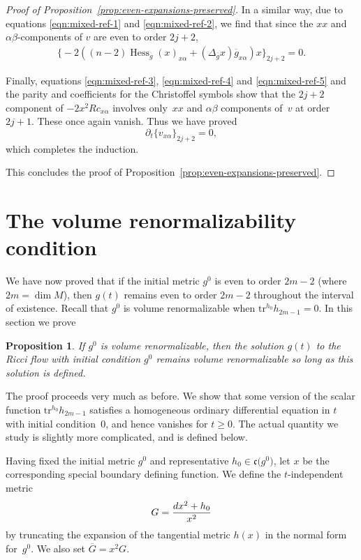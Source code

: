 \documentclass[11pt]{article}
\numberwithin{equation}{section}
\newtheorem{Proposition}[Theorem]{Proposition}
 { \theoremstyle{definition}
\newtheorem{Definition}[Theorem]{Definition}
\newtheorem{Example}[Theorem]{Example}
\newtheorem{Remark}[Theorem]{Remark} }
\newcommand{\olg}{\overline{g}}
\newcommand{\olG}{\overline{G}}
\newcommand{\frakc}{\mathfrak c}
\newcommand{\gin}{{g^0}}
\newcommand{\tr}{\mathrm{tr}}
\DeclareMathOperator{\hess}{Hess}
\begin{document}
\begin{proof}[Proof of Proposition~\ref{prop:even-expansions-preserved}]
In a similar way, due to equations \eqref{eqn:mixed-ref-1} and \eqref{eqn:mixed-ref-2}, we find that since the $xx$ and $\alpha \beta$-components of $v$ are even to order $2j+2$,
\begin{gather*} \big\{ {-}2 ( (n-2) \hess_{\olg} (x)_{x\alpha} + (\Delta_{\olg} x) \olg_{x \alpha} ) x\big\}_{2j+2} = 0.
\end{gather*}

Finally, equations \eqref{eqn:mixed-ref-3}, \eqref{eqn:mixed-ref-4} and \eqref{eqn:mixed-ref-5} and the parity and coefficients for the Christoffel symbols show that the $2j+2$ component of $-2 x^2 Rc_{x\alpha}$ involves only~$xx$ and $\alpha \beta$ components of~$v$ at order~$2j+1$. These once again vanish. Thus we have proved
\[ \partial_t \{v_{x \alpha}\}_{2j+2} = 0, \]
which completes the induction.

This concludes the proof of Proposition~\ref{prop:even-expansions-preserved}.
\end{proof}

\section{The volume renormalizability condition} \label{VRandRF}

We have now proved that if the initial metric $\gin$ is even to order $2m-2$ (where $2m = \dim M$), then $g(t)$ remains even to order $2m-2$ throughout the interval of existence. Recall that $\gin$ is volume renormalizable when $\tr^{h_0} h_{2m-1} = 0$. In this section we prove
\begin{Proposition} \label{prop:volume-renorm-preserved}If $\gin$ is volume renormalizable, then the solution $g(t)$ to the Ricci flow with initial condition $\gin$ remains volume renormalizable so long as this solution is defined.
\end{Proposition}

The proof proceeds very much as before. We show that some version of the scalar function $\tr^{h_0} h_{2m-1}$ satisfies a homogeneous ordinary differential equation in $t$ with initial condition~$0$, and hence vanishes for $t \geq 0$. The actual quantity we study is slightly more complicated, and is defined below.

Having fixed the initial metric $\gin$ and representative $h_0 \in \frakc\big(\gin\big)$, let $x$ be the corresponding special boundary defining function. We define the $t$-independent metric
\begin{gather*}%
G = \frac{{\rm d}x^2 + h_0}{x^2}
\end{gather*}
by truncating the expansion of the tangential metric $h(x)$ in the normal form for~$\gin$. We also set $\olG = x^2 G$.
\end{document}
